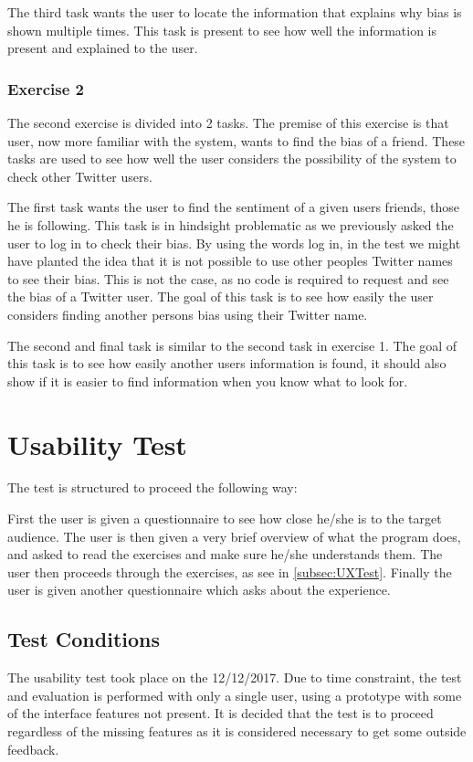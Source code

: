 The third task wants the user to locate the information that explains why bias
is shown multiple times. This task is present to see how well the information
is present and explained to the user.

\subsubsection{Exercise 2}
The second exercise is divided into 2 tasks. The premise of this exercise is
that user, now more familiar with the system, wants to find the bias of a
friend. These tasks are used to see how well the user considers the possibility
of the system to check other Twitter users.\nl

The first task wants the user to find the sentiment of a given users
friends, those he is following. This task is in hindsight problematic as we
previously asked the user to log in to check their bias. By using the words log
in, in the test we might have planted the idea that it is not possible to use
other peoples Twitter names to see their bias. This is not the case, as no code
is required to request and see the bias of a Twitter user. The goal of this task
is to see how easily the user considers finding another persons bias using
their Twitter name.\nl

The second and final task is similar to the second task in exercise 1. The goal
of this task is to see how easily another users information is found, it should
also show if it is easier to find information when you know what to look for.


\section{Usability Test}\label{sec:UXUT}
The test is structured to proceed the following way:\nl

First the user is given a questionnaire to see how close he/she is to the target
audience. The user is then given a very brief overview of what the program
does, and asked to read the exercises and make sure he/she understands them. The
user then proceeds through the exercises, as see in \autoref{subsec:UXTest}.
Finally the user is given another questionnaire which asks about the experience.

\subsection{Test Conditions}
The usability test took place on the 12/12/2017. Due to time constraint, the
test and evaluation is performed with only a single user, using a prototype
with some of the interface features not present. It is decided that the test is
to proceed regardless of the missing features as it is considered necessary to
get some outside feedback.\nl

